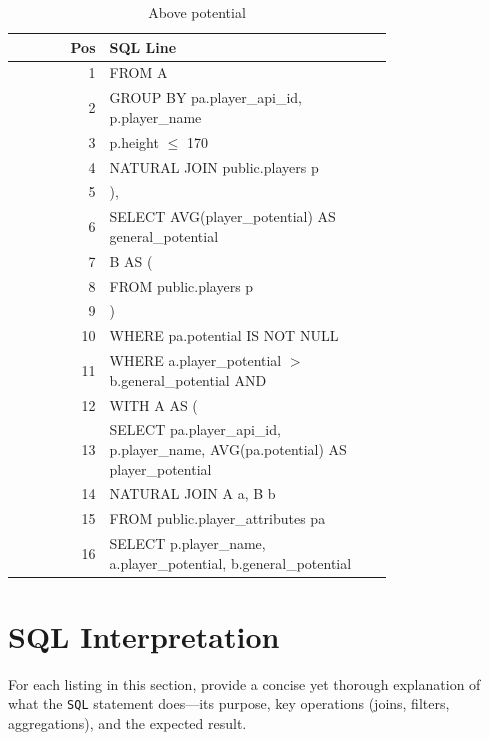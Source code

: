 \documentclass{article}
\begin{document}
\begin{table}[t]
  \centering
  \caption{Above potential}
  \label{tab:potential}
  \begin{tabular}{r p{0.75\linewidth}}
    \toprule
    \textbf{Pos}
    & \textbf{SQL Line} \\
    \midrule
    1
    &   FROM A \\
    2
    &   GROUP BY pa.player\_api\_id, p.player\_name \\
    3
    & 	p.height $\leq$ 170 \\
    4
    &   NATURAL JOIN public.players p \\
    5
    & ), \\
    6
    &   SELECT AVG(player\_potential) AS general\_potential \\
    7
    & B AS ( \\
    8
    & FROM public.players p \\
    9
    & ) \\
    10
    &   WHERE pa.potential IS NOT NULL \\
    11
    & WHERE a.player\_potential $>$ b.general\_potential AND \\
    12
    & WITH A AS ( \\
    13
    &   SELECT pa.player\_api\_id, p.player\_name, AVG(pa.potential) AS player\_potential \\
    14
    & NATURAL JOIN A a, B b \\
    15
    &   FROM public.player\_attributes pa \\
    16
    & SELECT p.player\_name, a.player\_potential, b.general\_potential \\
    \bottomrule
  \end{tabular}
\end{table}

\section{SQL Interpretation}

For each listing in this section, provide a concise yet thorough explanation of what the \texttt{SQL} statement does—its purpose, key operations (joins, filters, aggregations), and the expected result.
\end{document}
